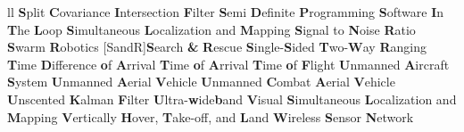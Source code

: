 \begin{abbreviations}{ll}
    		{\textbf{S}plit \textbf{C}ovariance \textbf{I}ntersection \textbf{F}ilter}
    		{\textbf{S}emi \textbf{D}efinite \textbf{P}rogramming}
    		{\textbf{S}oftware \textbf{I}n \textbf{T}he \textbf{L}oop}
    		{\textbf{S}imultaneous \textbf{L}ocalization and \textbf{M}apping}
    		{\textbf{S}ignal to \textbf{N}oise \textbf{R}atio}
    			{\textbf{S}warm \textbf{R}obotics}
    [SandR]{\textbf{S}earch \textbf{\&} \textbf{R}escue}
    		{\textbf{S}ingle-\textbf{S}ided \textbf{T}wo-\textbf{W}ay \textbf{R}anging}
    		{\textbf{T}ime \textbf{D}ifference \textbf{o}f \textbf{A}rrival}
    		{\textbf{T}ime \textbf{o}f \textbf{A}rrival}
    		{\textbf{T}ime \textbf{o}f \textbf{F}light}
    		{\textbf{U}nmanned \textbf{A}ircraft \textbf{S}ystem}
    		{\textbf{U}nmanned \textbf{A}erial \textbf{V}ehicle}
    		{\textbf{U}nmanned \textbf{C}ombat \textbf{A}erial \textbf{V}ehicle}
    		{\textbf{U}nscented \textbf{K}alman \textbf{F}ilter}
    		{\textbf{U}ltra-\textbf{w}ide\textbf{b}and}
    		{\textbf{V}isual \textbf{S}imultaneous \textbf{L}ocalization and \textbf{M}apping}
    		{\textbf{V}ertically \textbf{H}over, \textbf{T}ake-off, and \textbf{L}and}
    		{\textbf{W}ireless \textbf{S}ensor \textbf{N}etwork}
\end{abbreviations}
